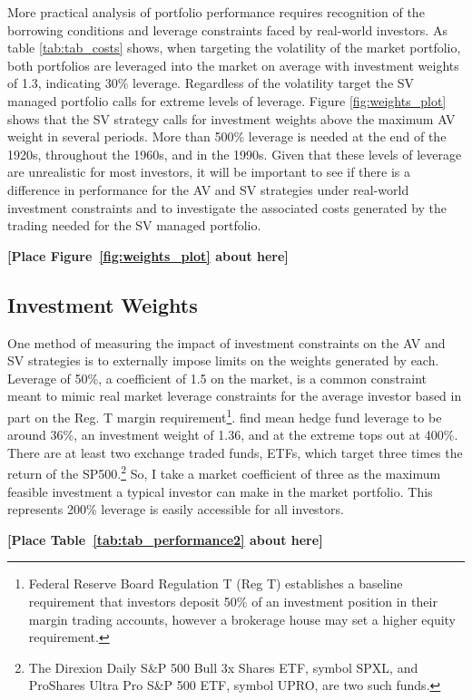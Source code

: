 More practical analysis of portfolio performance requires recognition of the borrowing conditions and leverage constraints faced by real-world investors. As table \ref{tab:tab_costs} shows, when targeting the volatility of the market portfolio, both portfolios are leveraged into the market on average with investment weights of 1.3, indicating 30\% leverage. Regardless of the volatility target the SV managed portfolio calls for extreme levels of leverage. Figure \ref{fig:weights_plot} shows that the SV strategy calls for investment weights above the maximum AV weight in several periods. More than 500\% leverage is needed at the end of the 1920s, throughout the 1960s, and in the 1990s. Given that these levels of leverage are unrealistic for most investors, it will be important to see if there is a difference in performance for the AV and SV strategies under real-world investment constraints and to investigate the associated costs generated by the trading needed for the SV managed portfolio.
\bigskip
\centerline{\bf [Place Figure~\ref{fig:weights_plot} about here]}
\bigskip

\subsection{Investment Weights}
One method of measuring the impact of investment constraints on the AV and SV strategies is to externally impose limits on the weights generated by each. Leverage of 50\%, a coefficient of 1.5 on the market, is a common constraint meant to mimic real market leverage constraints for the average investor based in part on the Reg. T margin requirement\footnote{Federal Reserve Board Regulation T (Reg T) establishes a baseline requirement that investors deposit 50\% of an investment position in their margin trading accounts, however a brokerage house may set a higher equity requirement.}. \citep{Campbell2008,Rapach2010,Rapach2013,Huang2015,Rapach2016,moreira_volatility-managed_2017,deuskar_margin_2017} \citet{ang_hedge_2011} find mean hedge fund leverage to be around 36\%, an investment weight of 1.36, and at the extreme tops out at 400\%. There are at least two exchange traded funds, ETFs, which target three times the return of the SP500.\footnote{The Direxion Daily S\&P 500 Bull 3x Shares ETF, symbol SPXL, and ProShares Ultra Pro S\&P 500 ETF, symbol UPRO, are two such funds.} So, I take a market coefficient of three as the maximum feasible investment a typical investor can make in the market portfolio. This represents 200\% leverage is easily accessible for all investors.
\bigskip
\centerline{\bf [Place Table~\ref{tab:tab_performance2} about here]}
\bigskip

